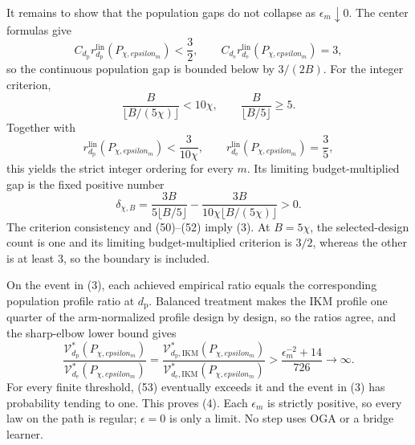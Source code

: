 It remains to show that the population gaps do not collapse as \(\epsilon_m\downarrow0\).  The center formulas give
\[
 C_{d_{\mathrm p}}r_{d_{\mathrm p}}^{\mathrm{lin}}(P_{\chi,epsilon_m})<\frac32,
 \qquad
 C_{d_{\mathrm e}}r_{d_{\mathrm e}}^{\mathrm{lin}}(P_{\chi,epsilon_m})=3, \tag{50}
\]
so the continuous population gap is bounded below by \(3/(2B)\).  For the integer criterion,
\[
 \frac{B}{\lfloor B/(5\chi)\rfloor}<10\chi,
 \qquad
 \frac{B}{\lfloor B/5\rfloor}\ge5.                       \tag{51}
\]
Together with
\[
 r_{d_{\mathrm p}}^{\mathrm{lin}}(P_{\chi,epsilon_m})<\frac3{10\chi},
 \qquad r_{d_{\mathrm e}}^{\mathrm{lin}}(P_{\chi,epsilon_m})=\frac35,
\]
this yields the strict integer ordering for every \(m\).  Its limiting budget-multiplied gap is the fixed positive number
\[
 \delta_{\chi,B}=
 \frac{3B}{5\lfloor B/5\rfloor}
 -\frac{3B}{10\chi\lfloor B/(5\chi)\rfloor}>0.            \tag{52}
\]
The criterion consistency and (50)--(52) imply (3).  At \(B=5\chi\), the selected-design count is one and its limiting budget-multiplied criterion is \(3/2\), whereas the other is at least \(3\), so the boundary is included.

On the event in (3), each achieved empirical ratio equals the corresponding population profile ratio at \(d_{\mathrm p}\).  Balanced treatment makes the IKM profile one quarter of the arm-normalized profile design by design, so the ratios agree, and the sharp-elbow lower bound gives
\[
 \frac{\mathcal V_{d_{\mathrm p}}^*(P_{\chi,epsilon_m})}
 {\mathcal V_{d_{\mathrm e}}^*(P_{\chi,epsilon_m})}
 =\frac{\mathcal V_{d_{\mathrm p},\mathrm{IKM}}^*(P_{\chi,epsilon_m})}
 {\mathcal V_{d_{\mathrm e},\mathrm{IKM}}^*(P_{\chi,epsilon_m})}
 >\frac{\epsilon_m^{-2}+14}{726}\longrightarrow\infty.  \tag{53}
\]
For every finite threshold, (53) eventually exceeds it and the event in (3) has probability tending to one.  This proves (4).  Each \(\epsilon_m\) is strictly positive, so every law on the path is regular; \(\epsilon=0\) is only a limit.  No step uses OGA or a bridge learner.